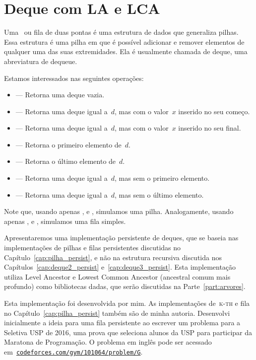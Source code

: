 \documentclass[main.tex]{subfiles}
\begin{document}
\chapter{Deque com LA e LCA} \label{cap:deque1_persist}

Uma~ ou fila de duas pontas é uma estrutura de dados que generaliza pilhas. Essa estrutura é uma pilha em que é possível adicionar e remover elementos de qualquer uma das suas extremidades. Ela é usualmente chamada de deque, uma abreviatura de dequeue.

Estamos interessados nas seguintes operações:

\begin{itemize}
	\item {} --- Retorna uma deque vazia.
	\item {} --- Retorna uma deque igual a~$d$, mas com o valor~$x$ inserido no seu começo.
	\item {} --- Retorna uma deque igual a~$d$, mas com o valor~$x$ inserido no seu final.
	\item {} --- Retorna o primeiro elemento de~$d$.
	\item {} --- Retorna o último elemento de~$d$.
	\item {} --- Retorna uma deque igual a~$d$, mas sem o primeiro elemento.
	\item {} --- Retorna uma deque igual a~$d$, mas sem o último elemento.
\end{itemize}

Note que, usando apenas ,  e , simulamos uma pilha. Analogamente, usando apenas ,  e , simulamos uma fila simples.

Apresentaremos uma implementação persistente de deques, que se baseia nas implementações de pilhas e filas persistentes discutidas no Capítulo~\ref{cap:pilha_persist}, e não na estrutura recursiva discutida nos Capítulos~\ref{cap:deque2_persist} e~\ref{cap:deque3_persist}. Esta implementação utiliza Level Ancestor e Lowest Common Ancestor (ancestral comum mais profundo) como bibliotecas dadas, que serão discutidas na Parte~\ref{part:arvores}.

Esta implementação foi desenvolvida por mim. As implementações de~\textsc{k-th} e fila no Capítulo~\ref{cap:pilha_persist} também são de minha autoria. Desenvolvi inicialmente a ideia para uma fila persistente ao escrever um problema para a Seletiva USP de 2016, uma prova que seleciona alunos da USP para participar da Maratona de Programação. O problema em inglês pode ser acessado em~\href{http://codeforces.com/gym/101064/problem/G}{\texttt{codeforces.com/gym/101064/problem/G}}.
\end{document}
